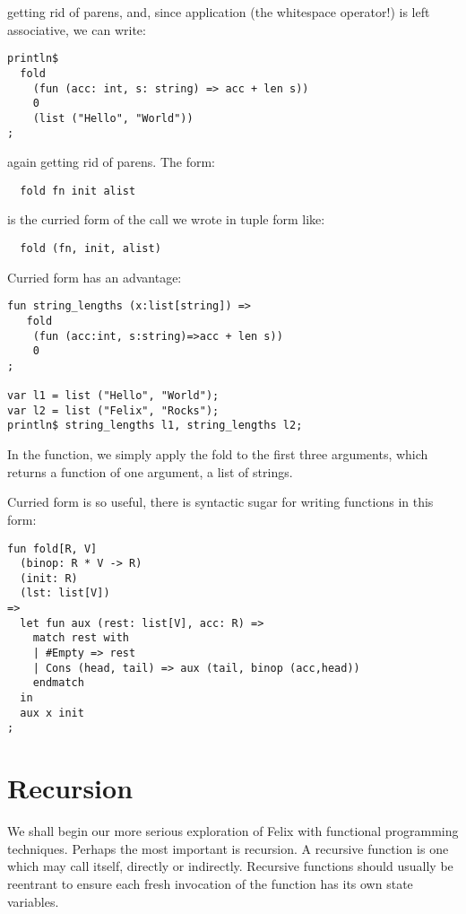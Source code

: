 \documentclass[oneside]{book}
\begin{document}
getting rid of parens, and, since application (the whitespace operator!) is 
left associative, we can write:

\begin{verbatim}
println$ 
  fold 
    (fun (acc: int, s: string) => acc + len s))
    0
    (list ("Hello", "World"))
;
\end{verbatim}

again getting rid of parens. The form:

\begin{verbatim}
  fold fn init alist
\end{verbatim}

is the curried form of the call we wrote in tuple form like:

\begin{verbatim}
  fold (fn, init, alist)
\end{verbatim}

Curried form has an advantage:

\begin{verbatim}
fun string_lengths (x:list[string]) =>
   fold 
    (fun (acc:int, s:string)=>acc + len s))
    0
;

var l1 = list ("Hello", "World");
var l2 = list ("Felix", "Rocks");
println$ string_lengths l1, string_lengths l2;
\end{verbatim}

In the function, we simply apply the fold to the
first three arguments, which returns a function 
of one argument, a list of strings.

Curried form is so useful, there is syntactic sugar
for writing functions in this form:

\begin{verbatim}
fun fold[R, V] 
  (binop: R * V -> R)
  (init: R)
  (lst: list[V])
=>
  let fun aux (rest: list[V], acc: R) =>
    match rest with
    | #Empty => rest
    | Cons (head, tail) => aux (tail, binop (acc,head))
    endmatch
  in 
  aux x init
;
\end{verbatim}


\chapter{Recursion}
We shall begin our more serious exploration of Felix with functional programming
techniques. Perhaps the most important is recursion. A recursive function
is one which may call itself, directly or indirectly. 
Recursive functions should usually be reentrant to ensure each fresh invocation
of the function has its own state variables.
\end{document}

